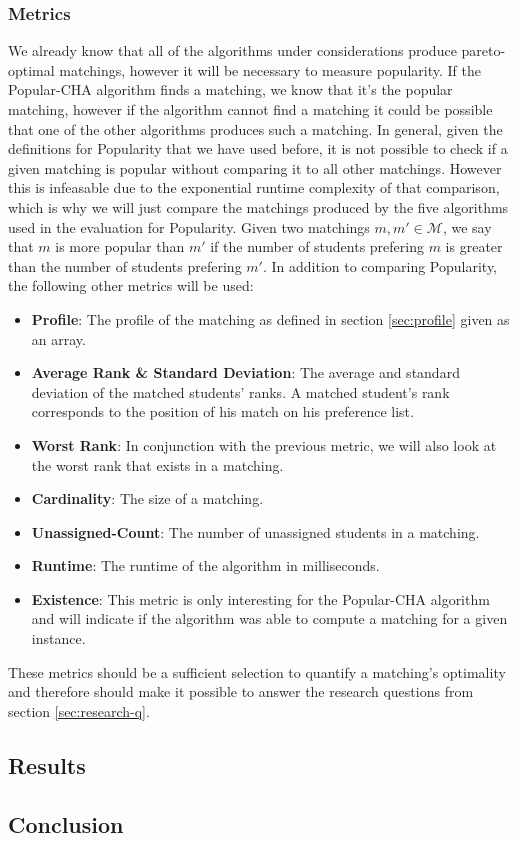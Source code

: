 \subsubsection{Metrics}
We already know that all of the algorithms under considerations produce pareto-optimal matchings, however it will be necessary to measure popularity. If the Popular-CHA algorithm finds a matching, we know that it's the popular matching, however if the algorithm cannot find a matching it could be possible that one of the other algorithms produces such a matching. In general, given the definitions for Popularity that we have used before, it is not possible to check if a given matching is popular without comparing it to all other matchings. However this is infeasable due to the exponential runtime complexity of that comparison, which is why we will just compare the matchings produced by the five algorithms used in the evaluation for Popularity. Given two matchings $m, m' \in \mathcal{M}$, we say that $m$ is more popular than $m'$ if the number of students prefering $m$ is greater than the number of students prefering $m'$. 
In addition to comparing Popularity, the following other metrics will be used:
\begin{itemize}
  \item \textbf{Profile}: The profile of the matching as defined in section \ref{sec:profile} given as an array.
  \item \textbf{Average Rank \& Standard Deviation}: The average and standard deviation of the matched students' ranks. A matched student's rank corresponds to the position of his match on his preference list.
  \item \textbf{Worst Rank}: In conjunction with the previous metric, we will also look at the worst rank that exists in a matching.
  \item \textbf{Cardinality}: The size of a matching.
  \item \textbf{Unassigned-Count}: The number of unassigned students in a matching.
  \item \textbf{Runtime}: The runtime of the algorithm in milliseconds.
  \item \textbf{Existence}: This metric is only interesting for the Popular-CHA algorithm and will indicate if the algorithm was able to compute a matching for a given instance.
\end{itemize}

These metrics should be a sufficient selection to quantify a matching's optimality and therefore should make it possible to answer the research questions from section \ref{sec:research-q}.

\subsection{Results}

\subsection{Conclusion}